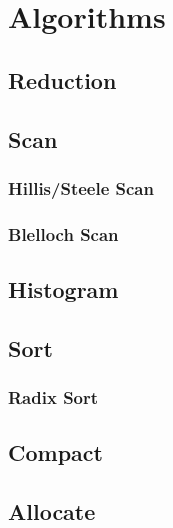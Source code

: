 \documentclass[12px,oz]{report}
\theoremstyle{indented}
\begin{document}
\chapter{Algorithms}
\label{ch:algorithms}


	\section{Reduction}
	\label{sec:al_reduction}
	
	
	\section{Scan}
	\label{sec:al_scan}
	
	
		\subsection{Hillis/Steele Scan}
		\label{sec:al_scan_hillis_steele}
		
		
		\subsection{Blelloch Scan}
		\label{sec:al_scan_blelloch}
		
	
	\section{Histogram}
	\label{sec:al_histogram}
	
	
	\section{Sort}
	\label{sec:al_sort}
	
	
		\subsection{Radix Sort}
		\label{sec:al_sort_radix}
		

	\section{Compact}
	\label{sec-compact}
	
	
	\section{Allocate}
	\label{sec-allocate}
	
	
\end{document}
